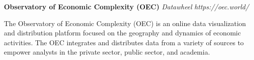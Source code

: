 \item
\headerrow
{\textbf{Observatory of Economic Complexity (OEC)}}
{\emph{}}
\headerrow
{\emph{Datawheel}}
{\emph{https://oec.world/}}
\begin{itemize*}
    \item The Observatory of Economic Complexity (OEC) is an online data visualization 
    and distribution platform focused on the geography and dynamics of economic activities. 
    The OEC integrates and distributes data from a variety of sources to empower analysts 
    in the private sector, public sector, and academia.
\end{itemize*}
